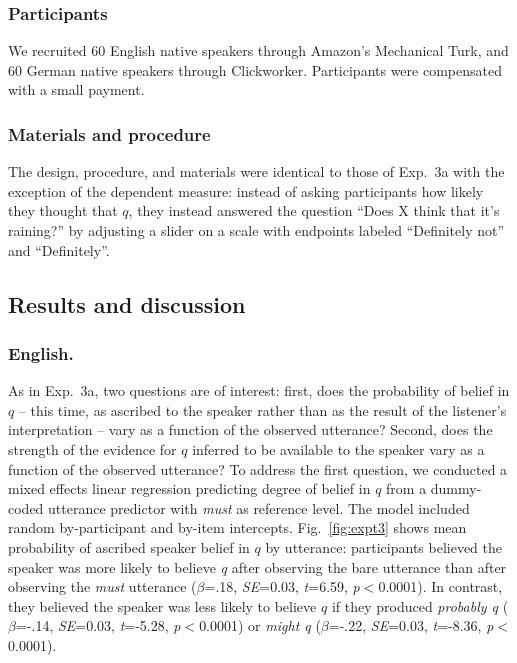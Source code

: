 \documentclass[11pt]{article}
\begin{document}
\subsubsection{Participants}

We recruited 60 English native speakers through Amazon's Mechanical Turk, and 60 German native speakers through Clickworker. Participants were compensated with a small payment.

\subsubsection{Materials and procedure}

The design, procedure, and materials were identical to those of Exp.~3a with the exception of the dependent measure: instead of asking participants how likely they thought that $q$, they instead answered the question ``Does X think that it's raining?'' by adjusting a slider on a scale with endpoints labeled ``Definitely not'' and ``Definitely''. 

\subsection{Results and discussion}

\subsubsection{English.} As in Exp.~3a, two questions are of interest: first, does the probability of  belief in $q$ -- this time, as ascribed to the speaker rather than as the result of the listener's interpretation --  vary as a function of the observed utterance? Second, does the strength of the evidence for $q$ inferred to be available to the speaker vary as a function of the observed utterance? To address the first question, we conducted a mixed effects linear regression predicting degree of belief in $q$ from a dummy-coded utterance predictor with \emph{must} as reference level. The model included random by-participant and by-item intercepts. Fig.~\ref{fig:expt3} shows mean probability of ascribed speaker belief in $q$ by utterance: participants believed the speaker was more likely to believe \emph{q}  after observing the bare utterance than after observing the \emph{must} utterance   ($\beta$=.18, \emph{SE}=0.03, \emph{t}=6.59, \emph{p}$<$0.0001). In contrast, they believed the speaker was less likely to believe $q$ if they produced \emph{probably q} ($\beta$=-.14, \emph{SE}=0.03, \emph{t}=-5.28, \emph{p}$<$0.0001) or \emph{might q} ($\beta$=-.22, \emph{SE}=0.03, \emph{t}=-8.36, \emph{p}$<$0.0001). 
\end{document}
